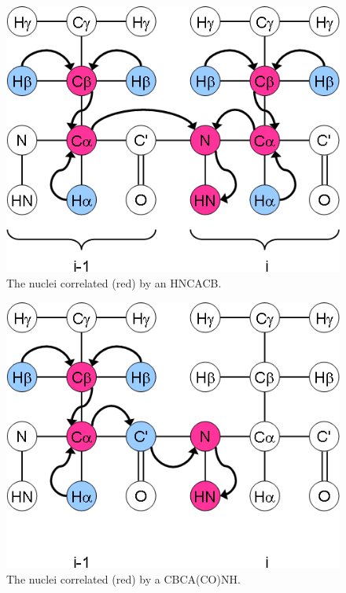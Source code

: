 \begin{figure}
  \includegraphics[scale=0.75]{figures/ccpn_hncacb}
  \caption[The nuclei correlated by an HNCACB.]
          {The nuclei correlated (red) by an HNCACB.}
  \label{ccpn_hncacb}
\end{figure}

\begin{figure}
  \includegraphics[scale=0.75]{figures/ccpn_cbcaconh}
  \caption[The nuclei correlated by a CBCA(CO)NH.]
          {The nuclei correlated (red) by a CBCA(CO)NH.}
  \label{ccpn_cbcaconh}
\end{figure}

